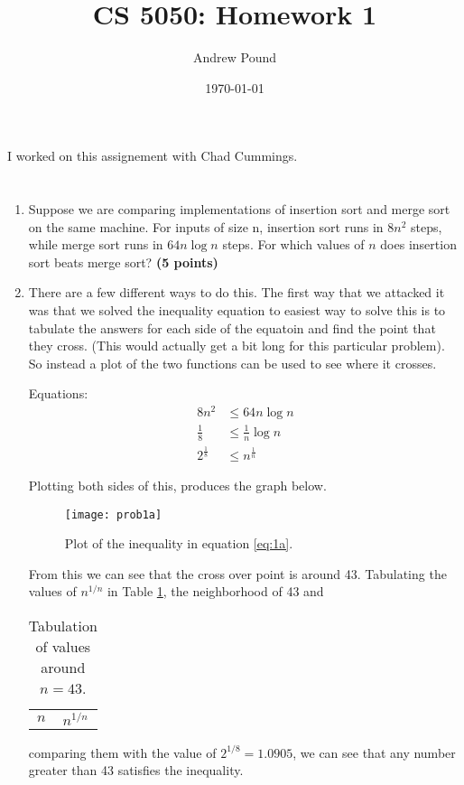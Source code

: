 \documentclass{article}
\title{CS 5050: Homework 1}
\author{Andrew Pound}
\date{\today}
\begin{document}
\maketitle

I worked on this assignement with Chad Cummings.
\section{}
\begin{enumerate}[label=(\alph*)]
\item  Suppose we are comparing implementations of insertion sort and 
merge sort on the same machine. For inputs of size n, insertion sort
runs in $8n^2$ steps, while merge sort runs in $64n \log n$ steps. For
which values of $n$ does insertion sort beats merge sort? {\bf (5
  points)} 
\item[]
There are a few different ways to do this. The first way that we
attacked it was that we solved the inequality equation to easiest way
to solve this is to tabulate the answers for each side of the equatoin
and find the point that they cross.  (This would actually get a bit
long for this particular problem).  So instead a plot of the two
functions can be used to see where it crosses.

Equations:
\begin{equation}\label{eq:1a}
  \begin{split}
    8n^2 &\le 64n\log n\\
    \frac{1}{8} &\le  \frac{1}{n}\log n\\
    2^{\frac{1}{8}} &\le n^{\frac{1}{n}}
  \end{split}
\end{equation}

Plotting both sides of this, produces the graph below.
\begin{figure}[h!t]
  \centering
  \texttt{[image: prob1a]}
  \caption{Plot of the inequality in equation \ref{eq:1a}.}
  \label{fig:prob1a}
\end{figure}

From this we can see that the cross over point is around 43.
Tabulating the values of $n^{1/n}$ in Table \ref{tab:1a}, the
neighborhood of 43 and 
\begin{table}[h!t]
  \centering
  \caption{Tabulation of values around $n=43$.}
  \label{tab:1a}
  \begin{tabular}{cc}
    $n$ & $n^{1/n}$ \\
    
  \end{tabular}
\end{table}
comparing them with the value of $2^{1/8} = 1.0905$, we can see that
any number greater than 43 satisfies the inequality.  



\end{enumerate}
\end{document}
